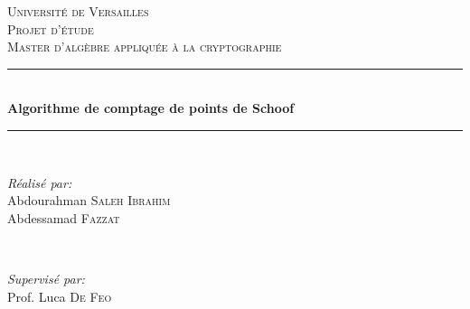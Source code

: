 \documentclass[letterpaper, 12pt]{article}
\begin{document}
\begin{titlepage}

\newcommand{\HRule}{\rule{\linewidth}{0.5mm}} %

\center


\textsc{\LARGE Université de Versailles}\\[1.5cm] %
\textsc{\Large Projet d'étude }\\[0.5cm] %
\textsc{\large Master d'algèbre appliquée à la cryptographie}\\[0.5cm] %


\HRule \\[0.4cm]
{ \huge \bfseries Algorithme de comptage de points de Schoof}\\[0.1cm] %
\HRule \\[1.5cm]


\begin{minipage}{0.5\textwidth}
\begin{flushleft}
\emph{Réalisé par:}\\
Abdourahman \textsc{Saleh Ibrahim}\\
Abdessamad \textsc{Fazzat}

\end{flushleft}
\end{minipage}
~
\begin{minipage}{0.4\textwidth}
\begin{flushright}
\emph{Supervisé par:} \\
Prof. Luca \textsc{De Feo}
\end{flushright}
\end{minipage}\\[2cm]



\end{titlepage}
\end{document}
